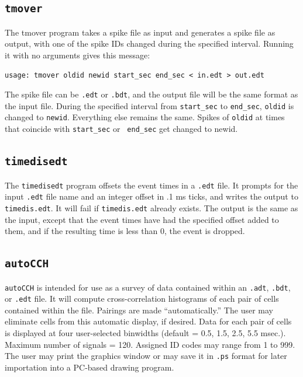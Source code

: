 \documentclass[12pt]{article}
\begin{document}
\subsection{\tt tmover}

The tmover program takes a spike file as input and generates a spike
file as output, with one of the spike IDs changed during the specified
interval. Running it with no arguments gives this message:
\begin{verbatim}
usage: tmover oldid newid start_sec end_sec < in.edt > out.edt
\end{verbatim}
The spike file can be {\tt .edt} or {\tt .bdt}, and the output file
will be the same format as the input file. During the specified
interval from {\tt start\_sec} to {\tt end\_sec}, {\tt oldid} is
changed to {\tt newid}. Everything else remains the same. Spikes of
{\tt oldid} at times that coincide with {\tt start\_sec} or {\tt
  end\_sec} get changed to newid.

\subsection{\tt timedisedt}

The {\tt timedisedt} program offsets the event times in a {\tt .edt}
file. It prompts for the input {\tt .edt} file name and an integer
offset in .1 ms ticks, and writes the output to {\tt timedis.edt}. It
will fail if {\tt timedis.edt} already exists. The output is the same
as the input, except that the event times have had the specified
offset added to them, and if the resulting time is less than 0, the
event is dropped.

\subsection{\tt autoCCH}

{\tt autoCCH} is intended for use as a survey of data contained within
an {\tt .adt}, {\tt .bdt}, or {\tt .edt} file. It will compute
cross-correlation histograms of each pair of cells contained within
the file. Pairings are made ``automatically.'' The user may eliminate
cells from this automatic display, if desired. Data for each pair of
cells is displayed at four user-selected binwidths (default = 0.5,
1.5, 2.5, 5.5 msec.). Maximum number of signals = 120. Assigned ID
codes may range from 1 to 999.  The user may print the graphics window
or may save it in {\tt .ps} format for later importation into a
PC-based drawing program.
\end{document}
